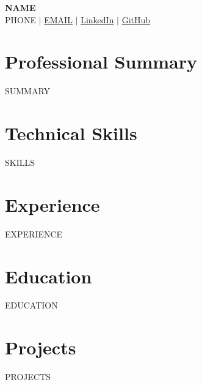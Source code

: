 \documentclass[letterpaper,11pt]{article}
\newcommand{\resumeSubHeadingListStart}{\begin{itemize}[leftmargin=0.15in, label={}]}
\newcommand{\resumeSubHeadingListEnd}{\end{itemize}}
\begin{document}
\begin{center}
    \textbf{\Huge \scshape {{NAME}}} \\ \vspace{1pt}
    \small {{PHONE}} $|$ \href{mailto:{{EMAIL}}}{{{EMAIL}}} $|$ 
    \href{{{LINKEDIN}}}{LinkedIn} $|$
    \href{{{GITHUB}}}{GitHub}
\end{center}

\section{Professional Summary}
\small{{{SUMMARY}}}

\section{Technical Skills}
 \begin{itemize}[leftmargin=0.15in, label={}]
    \small{\item{
     {{SKILLS}}
    }}
 \end{itemize}

\section{Experience}
  \resumeSubHeadingListStart
    {{EXPERIENCE}}
  \resumeSubHeadingListEnd

\section{Education}
  \resumeSubHeadingListStart
    {{EDUCATION}}
  \resumeSubHeadingListEnd

\section{Projects}
    \resumeSubHeadingListStart
      {{PROJECTS}}
    \resumeSubHeadingListEnd

\end{document}
